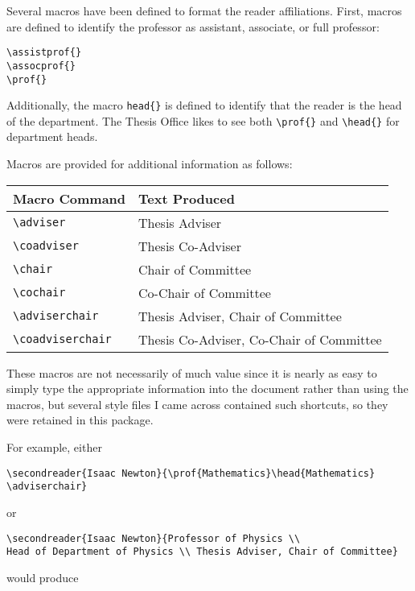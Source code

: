 \documentclass[11pt]{article}
\begin{document}
\begin{singlespace}
Several macros have been defined to format the reader affiliations.  First,
macros are defined to identify the professor as assistant, associate, or full
professor:
\begin{verbatim}
\assistprof{}
\assocprof{}
\prof{}
\end{verbatim}
\noindent Additionally, the macro \verb+head{}+ is defined to identify that the
reader is the head of the department.  The Thesis Office likes to see both
\verb+\prof{}+ and \verb+\head{}+ for department heads.

Macros are provided for additional information as follows:

\begin{tabular}{ll}
Macro Command & Text Produced \\ \hline
\verb+\adviser+ & Thesis Adviser \\
\verb+\coadviser+ & Thesis Co-Adviser \\
\verb+\chair+ & Chair of Committee \\
\verb+\cochair+ & Co-Chair of Committee \\
\verb+\adviserchair+ & Thesis Adviser, Chair of Committee \\
\verb+\coadviserchair+ & Thesis Co-Adviser, Co-Chair of Committee
\end{tabular}

These macros are not necessarily of much value since it is nearly as easy to
simply type the appropriate information into the document rather than using the
macros, but several style files I came across contained such shortcuts, so they
were retained in this package.

For example, either

\begin{verbatim}
\secondreader{Isaac Newton}{\prof{Mathematics}\head{Mathematics}
\adviserchair} \end{verbatim}

\noindent or

\noindent\begin{verbatim}
\secondreader{Isaac Newton}{Professor of Physics \\ 
Head of Department of Physics \\ Thesis Adviser, Chair of Committee}
\end{verbatim}
 
\noindent would produce \vspace{0.25in}

\signature{Isaac Newton \\ Professor of Physics \\
  Head of Department of Physics \\ Thesis Adviser, Chair of Committee}


\end{singlespace}
\end{document}
